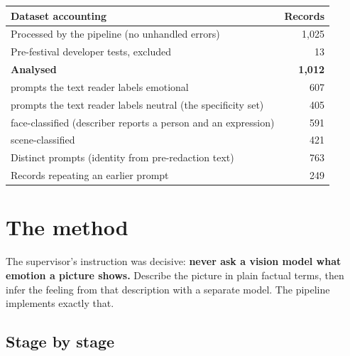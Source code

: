 \documentclass[11pt,a4paper]{article}
\begin{document}
\begin{center}
\begin{tabular}{@{}lr@{}}
\toprule
\textbf{Dataset accounting} & \textbf{Records}\\
\midrule
Processed by the pipeline (no unhandled errors) & 1{,}025\\
Pre-festival developer tests, excluded & 13\\
\textbf{Analysed} & \textbf{1{,}012}\\
\quad prompts the text reader labels emotional & 607\\
\quad prompts the text reader labels neutral (the specificity set) & 405\\
\quad face-classified (describer reports a person and an expression) & 591\\
\quad scene-classified & 421\\
Distinct prompts (identity from pre-redaction text) & 763\\
Records repeating an earlier prompt & 249\\
\bottomrule
\end{tabular}
\end{center}

\section{The method}

The supervisor's instruction was decisive: \textbf{never ask a vision model what emotion a picture
shows.} Describe the picture in plain factual terms, then infer the feeling from that description
with a separate model. The pipeline implements exactly that.

\subsection{Stage by stage}
\end{document}
